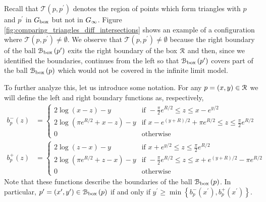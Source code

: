 Recall that $\mathcal{T}(p,p^\prime)$ denotes the region of points which form triangles with $p$ and $p^\prime$ in $G_{\mathrm{box}}$ but not in $G_{\infty}$. Figure \ref{fig:comparing_triangles_diff_intersections} shows an example of a configuration where $\mathcal{T}(p,p^\prime) \ne \emptyset$. We observe that $\mathcal{T}(p,p^\prime) \ne \emptyset$ because the right boundary of the ball ${\mathcal B}_{\text{box}}\left(p^\prime\right)$ exits the right boundary of the box ${\mathcal R}$ and then, since we identified the boundaries, continues from the left so that ${\mathcal B}_{\text{box}}\left(p^\prime\right)$ covers part of the ball ${\mathcal B}_{\text{box}}\left(p\right)$ which would not be covered in the infinite limit model. 


To further analyze this, let us introduce some notation. For any $p = (x,y) \in {\mathcal R}$ we will define the left and right boundary functions as, respectively,
\begin{align}
	b_p^-(z) &= \begin{cases}
		2 \log\left(x-z\right) - y &\mbox{if }  -\frac{\pi}{2} e^{R/2} \le z \le x - e^{y/2}  \\
		2\log\left(\pi e^{R/2} + x - z\right) - y 
			&\mbox{if } x - e^{(y + R)/2} + \pi e^{R/2} \le z \le \frac{\pi}{2} e^{R/2}\\
		0 &\mbox{otherwise}
	\end{cases}\\
	b_p^+(z) &= \begin{cases}
		2 \log\left(z-x\right) - y &\mbox{if } x + e^{y/2} \le z \le \frac{\pi}{2} e^{R/2} \\
		2\log\left(\pi e^{R/2} + z - x\right) - y 
			&\mbox{if } -\frac{\pi}{2} e^{R/2} \le z \le x + e^{(y + R)/2} - \pi e^{R/2}\\
		0 &\mbox{otherwise}
	\end{cases}
\end{align}
Note that these functions describe the boundaries of the ball ${\mathcal B}_{\text{box}}\left(p\right)$. In particular, $p^\prime = (x^\prime, y^\prime) \in {\mathcal B}_{\text{box}}\left(p\right)$ if and only if $y^\prime \ge \min\left\{b_p^-(x^\prime), b_p^+(x^\prime)\right\}$.


